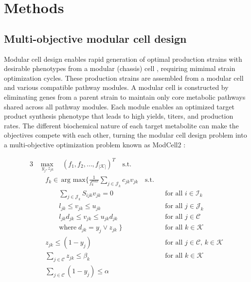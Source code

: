 
\section{Methods}
\subsection{Multi-objective modular cell design}
Modular cell design enables rapid generation of optimal production strains with desirable phenotypes from a modular (chassis) cell \cite{garcia2019}, requiring mimimal strain optimization cycles. These production strains are assembled from a modular cell and various compatible pathway modules. A modular cell is constructed by eliminating genes from a parent strain to maintain only core metabolic pathways shared across all pathway modules. Each module enables an optimized target product synthesis phenotype that leads to high yields, titers, and production rates. The different biochemical nature of each target metabolite can make the objectives compete with each other, turning the modular cell design problem into a multi-objective optimization problem known as ModCell2 \cite{garcia2019}:

\begin{alignat}{3}
	& \underset{ \; y_j, z_{jk}}{\max} \quad (f_1, f_2, \ldots, f_{|\mathcal{K}|})^T \quad \text{s.t.}  \label{eq4:of1} \\
	&  \quad f_k \in \, \text{arg }\underset{}{\text{max}} \Bigg\{ \frac{1}{f_k^{max}}\sum_{j \in \mathcal{J}_k} c_{jk}  v_{jk} \quad \text{s.t.} \label{eq4:of2}\\
	& \quad \qquad \sum_{j\in \mathcal{J}_k}S_{ijk}v_{jk} = 0 && \text{for all } i \in \mathcal{I}_k  \label{eq4:mb}\\
	& \quad \qquad  l_{jk} \le v_{jk} \le u_{jk}  && \text{for all } j \in \mathcal{J}_k \label{eq4:rb}\\
	& \quad \qquad  l_{jk} d_{jk} \le v_{jk} \le u_{jk} d_{jk} && \text{for all } j \in \mathcal{C} \label{eq4:db}\\
	& \quad \qquad \mathrm{where} \; d_{jk} = y_j \lor z_{jk} \; \Bigg\} && \text{for all } k \in \mathcal{K} \nonumber \\
	& \quad z_{jk}\le (1-y_j) && \text{for all } j \in \mathcal{C}, \, k \in \mathcal{K} \label{eq4:mr1}\\
	& \quad \sum_{j \in \mathcal{C}}z_{jk} \le \beta_k && \text{for all } k \in \mathcal{K} \label{eq4:mr2} \\
	& \quad \sum_{j \in \mathcal{C}} (1-y_j) \le \alpha \label{eq4:a}
\end{alignat}

